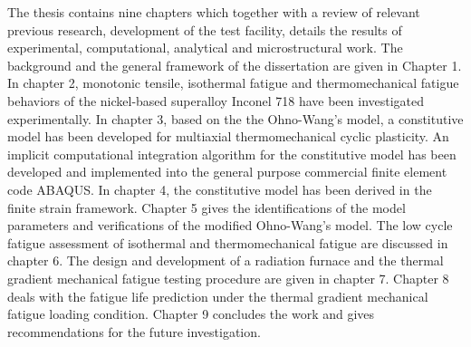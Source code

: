 The thesis contains nine chapters which together with a review of relevant previous research, development of the test facility, details the results of experimental, computational, analytical and microstructural work.
The background and the general framework of the dissertation are given in Chapter 1. 
In chapter 2, monotonic tensile, isothermal fatigue and thermomechanical fatigue behaviors of the nickel-based superalloy Inconel 718 have been investigated experimentally.
In chapter 3, based on the the Ohno-Wang's model, a constitutive model has been developed for multiaxial thermomechanical cyclic plasticity. An implicit computational integration algorithm for the constitutive model has been developed and implemented into the general purpose commercial finite element code ABAQUS.
In chapter 4, the constitutive model has been derived in the finite strain framework.
Chapter 5 gives the identifications of the model parameters and verifications of the modified Ohno-Wang's model.
The low cycle fatigue assessment of isothermal and thermomechanical fatigue are discussed in chapter 6.
The design and development of a radiation furnace and the thermal gradient mechanical fatigue testing procedure are given in chapter 7.
Chapter 8 deals with the fatigue life prediction under the thermal gradient mechanical fatigue loading condition.
Chapter 9 concludes the work and gives recommendations for the future investigation.




